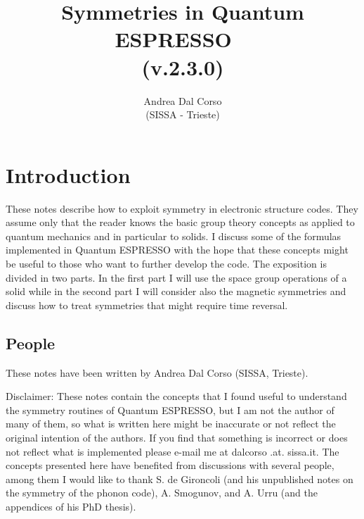 \documentclass[12pt,a4paper,twoside]{report}
\def\version{2.3.0}
\begin{document}
\author{Andrea Dal Corso \\ (SISSA - Trieste)}
\date{}

\title{
  \vspace{3truecm}
  \Huge \color{dark-blue} Symmetries in Quantum ESPRESSO \ \\
   (v.\version)
}

\maketitle

\newpage

\tableofcontents

\newpage

\newpage
{\color{dark-blue}\chapter{Introduction}}
These notes describe how to exploit symmetry in electronic structure codes. They assume only that the reader knows the basic group theory concepts as applied to quantum mechanics and in particular to solids. I discuss some of the formulas implemented in Quantum ESPRESSO with the hope that these concepts might be useful to those who want to further develop the code. The exposition is divided in two parts. In the first part I will use the space group operations of a solid while in the second part I will consider also the magnetic symmetries and discuss how to treat symmetries that might require time reversal. 


\newpage
\section{People}
These notes have been written by Andrea Dal Corso (SISSA, Trieste). 

Disclaimer: These notes contain the concepts that I found useful to understand the symmetry routines of Quantum ESPRESSO, but I am not the author of many of them, so what is written here might be inaccurate or not reflect the original intention of the authors. If you find that something is incorrect or does not reflect what is implemented please e-mail me at dalcorso .at. sissa.it. 
The concepts presented here have benefited from discussions with several people, among them I would like to thank S. de Gironcoli (and his unpublished notes on the symmetry of the phonon code), A. Smogunov, and A. Urru (and the appendices of his PhD thesis). 
\end{document}
